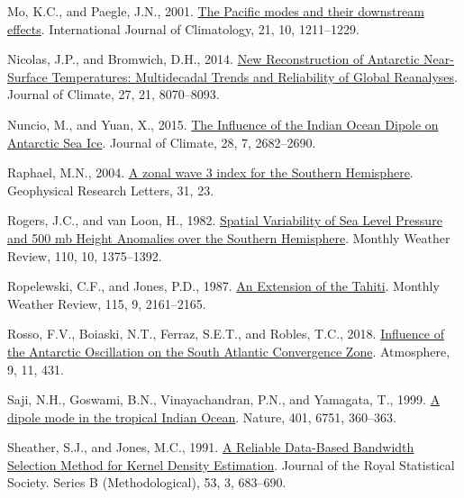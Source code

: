 \documentclass[12pt,oneside]{reedthesis}
\newlength{\cslhangindent}
\newenvironment{CSLReferences}[2] %
 {%
  \setlength{\parindent}{0pt}
  \ifodd #1 \everypar{\setlength{\hangindent}{\cslhangindent}}\ignorespaces\fi
  \ifnum #2 > 0
  \setlength{\parskip}{#2\baselineskip}
  \fi
 }%
 {}
\begin{document}
\begin{CSLReferences}{1}{0}
\leavevmode{}%
Mo, K.C., and Paegle, J.N., 2001. \href{https://doi.org/10.1002/joc.685}{The {Pacific} modes and their downstream effects}. International Journal of Climatology, 21, 10, 1211--1229.

\leavevmode{}%
Nicolas, J.P., and Bromwich, D.H., 2014. \href{https://doi.org/10.1175/JCLI-D-13-00733.1}{New {Reconstruction} of {Antarctic Near-Surface Temperatures}: {Multidecadal Trends} and {Reliability} of {Global Reanalyses}}. Journal of Climate, 27, 21, 8070--8093.

\leavevmode{}%
Nuncio, M., and Yuan, X., 2015. \href{https://doi.org/10.1175/JCLI-D-14-00390.1}{The {Influence} of the {Indian Ocean Dipole} on {Antarctic Sea Ice}}. Journal of Climate, 28, 7, 2682--2690.

\leavevmode{}%
Raphael, M.N., 2004. \href{https://doi.org/10.1029/2004GL020365}{A zonal wave 3 index for the {Southern Hemisphere}}. Geophysical Research Letters, 31, 23.

\leavevmode{}%
Rogers, J.C., and van Loon, H., 1982. \href{https://doi.org/10.1175/1520-0493(1982)110\%3C1375:SVOSLP\%3E2.0.CO;2}{Spatial {Variability} of {Sea Level Pressure} and 500 mb {Height Anomalies} over the {Southern Hemisphere}}. Monthly Weather Review, 110, 10, 1375--1392.

\leavevmode{}%
Ropelewski, C.F., and Jones, P.D., 1987. \href{https://doi.org/10.1175/1520-0493(1987)115\%3C2161:AEOTTS\%3E2.0.CO;2}{An {Extension} of the {Tahiti}}. Monthly Weather Review, 115, 9, 2161--2165.

\leavevmode{}%
Rosso, F.V., Boiaski, N.T., Ferraz, S.E.T., and Robles, T.C., 2018. \href{https://doi.org/10.3390/atmos9110431}{Influence of the {Antarctic Oscillation} on the {South Atlantic Convergence Zone}}. Atmosphere, 9, 11, 431.

\leavevmode{}%
Saji, N.H., Goswami, B.N., Vinayachandran, P.N., and Yamagata, T., 1999. \href{https://doi.org/10.1038/43854}{A dipole mode in the tropical {Indian Ocean}}. Nature, 401, 6751, 360--363.

\leavevmode{}%
Sheather, S.J., and Jones, M.C., 1991. \href{https://www.jstor.org/stable/2345597}{A {Reliable Data-Based Bandwidth Selection Method} for {Kernel Density Estimation}}. Journal of the Royal Statistical Society. Series B (Methodological), 53, 3, 683--690.


\end{CSLReferences}
\end{document}
